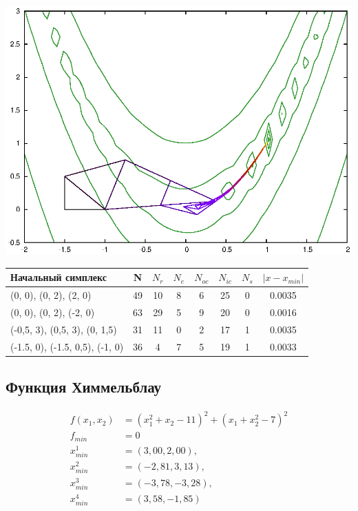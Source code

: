 \documentclass[12pt]{article}
\theoremstyle{plain}
\theoremstyle{remark}
\theoremstyle{definition}
\begin{document}
\includegraphics[scale=0.6]{rosenbrock4.eps}

\begin{tabular}{|l| c| c| c| c| c| c| c|}
\hline
  Начальный симплекс &N & $N_r$ & $N_e$ & $N_{oc}$ & $N_{ic}$ & $N_s$ & $\left| x - x_{min} \right|$ \\
\hline
 (0, 0), (0, 2), (2, 0) & 49 & 10 & 8 & 6 & 25 & 0 & 0.0035 \\
(0, 0), (0, 2), (-2, 0) & 63  & 29 & 5 & 9 & 20 & 0 & 0.0016 \\
(-0,5, 3), (0,5, 3), (0, 1,5) & 31 & 11 & 0 & 2 & 17 & 1 & 0.0035 \\
(-1.5, 0), (-1.5, 0,5), (-1, 0) & 36 & 4 & 7 & 5 & 19 & 1 & 0.0033 \\
\hline
\end{tabular}



\subsection{Функция Химмельблау}
\vspace{-0.6cm}
\begin{align*}
f(x_1, x_2) &= (x_1^2 + x_2 - 11) ^ 2 + (x_1 + x_2^2 - 7) ^ 2 \\
f_{min} &= 0 \\
x^1_{min} &= (3,00, 2,00),\\  x^2_{min} &= (-2,81, 3,13),\\ x^3_{min} &= (-3,78, -3,28),\\ x^4_{min} &= (3,58, -1,85)
\end{align*}
\end{document}
